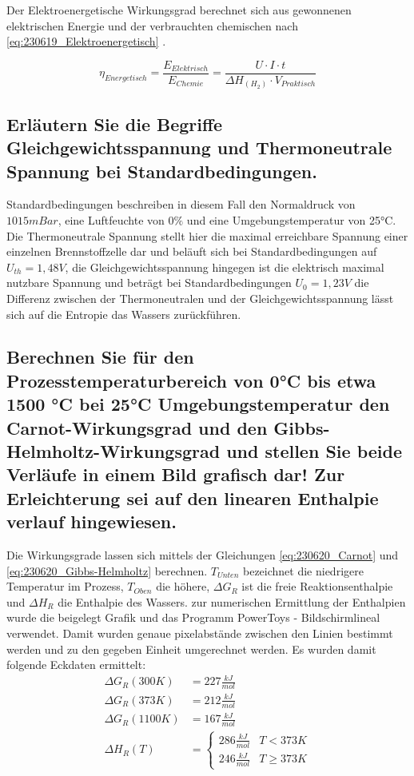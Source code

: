Der Elektroenergetische Wirkungsgrad berechnet sich aus gewonnenen elektrischen Energie und der verbrauchten chemischen nach \autoref{eq:230619_Elektroenergetisch} \cite{BZ-Folien}.

\begin{equation}
    \eta_{Energetisch} = \frac{E_{Elektrisch}}{E_{Chemie}} = \frac{U \cdot I \cdot t}{\Delta H_{(H_2)} \cdot V_{Praktisch}}
    \label{eq:230619_Elektroenergetisch}
\end{equation}

\subsection{Erläutern Sie die Begriffe Gleichgewichtsspannung und Thermoneutrale Spannung bei Standardbedingungen.}

Standardbedingungen beschreiben in diesem Fall den Normaldruck von $1015mBar$, eine Luftfeuchte von $0\%$ und eine Umgebungstemperatur von 25°C.
Die Thermoneutrale Spannung stellt hier die maximal erreichbare Spannung einer einzelnen Brennstoffzelle dar und beläuft sich bei Standardbedingungen auf $U_{th} = 1,48V$, 
die Gleichgewichtsspannung hingegen ist die elektrisch maximal nutzbare Spannung und beträgt bei Standardbedingungen $U_0 = 1,23V$ die Differenz zwischen der Thermoneutralen und der Gleichgewichtsspannung lässt sich auf die Entropie das Wassers zurückführen.   

\subsection{Berechnen Sie für den Prozesstemperaturbereich von 0°C bis etwa 1500 °C bei 25°C
Umgebungstemperatur den Carnot-Wirkungsgrad und den Gibbs- Helmholtz-Wirkungsgrad
und stellen Sie beide Verläufe in einem Bild grafisch dar! Zur Erleichterung sei auf den
linearen Enthalpie verlauf hingewiesen.}

Die Wirkungsgrade lassen sich mittels der Gleichungen \ref{eq:230620_Carnot} und \ref{eq:230620_Gibbs-Helmholtz} berechnen. 
$T_{Unten}$ bezeichnet die niedrigere Temperatur im Prozess, $T_{Oben}$ die höhere, $\Delta G_R$ ist die freie Reaktionsenthalpie und $\Delta H_R$ die Enthalpie des Wassers.
zur numerischen Ermittlung der Enthalpien wurde die beigelegt Grafik und das Programm PowerToys - Bildschirmlineal verwendet.
Damit wurden genaue pixelabstände zwischen den Linien bestimmt werden und zu den gegeben Einheit umgerechnet werden.
Es wurden damit folgende Eckdaten ermittelt:
\begin{align}
    \Delta G_R(300K) &= 227 \frac{kJ}{mol} \nonumber\\
    \Delta G_R(373K) &= 212 \frac{kJ}{mol} \nonumber\\
    \Delta G_R(1100K) &= 167 \frac{kJ}{mol} \nonumber\\
    \Delta H_R(T) &= 
        \begin{cases}
            286 \frac{kJ}{mol} & T < 373 K \\
            246 \frac{kJ}{mol} & T \geq 373 K
        \end{cases} \nonumber
\end{align}

